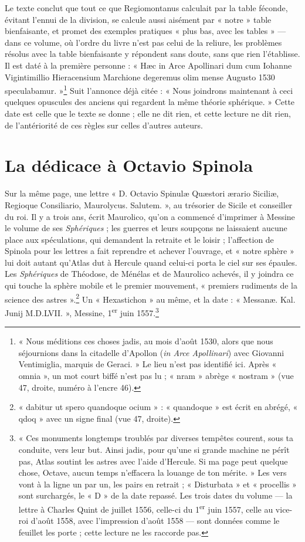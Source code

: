 \documentclass[11pt,a4paper]{article}
\begin{document}
Le texte conclut que tout ce que Regiomontanus calculait par la table féconde,
évitant l'ennui de la division, se calcule aussi aisément par « notre » table
bienfaisante, et promet des exemples pratiques « plus bas, avec les tables » —
dans ce volume, où l'ordre du livre n'est pas celui de la reliure, les problèmes
résolus avec la table bienfaisante y répondent sans doute, sans que rien
l'établisse. Il est daté à la
première personne : « Hæc in Arce Apollinari dum cum Iohanne Vigintimillio
Hieracensium Marchione degeremus olim mense Augusto 1530
speculabamur. »\footnote{« Nous méditions ces choses jadis, au mois d'août 1530,
alors que nous séjournions dans la citadelle d'Apollon (\emph{in Arce
Apollinari}) avec Giovanni Ventimiglia, marquis de Geraci. » Le lieu n'est pas
identifié ici. Après « omnia », un mot court biffé n'est pas lu ; « nram » abrège
« nostram » (vue 47, droite, numéro à l'encre 46).} Suit l'annonce déjà citée :
« Nous joindrons maintenant à ceci quelques opuscules des anciens qui regardent la
même théorie sphérique. » Cette date est celle que le texte se donne ; elle ne
dit rien, et cette lecture ne dit rien, de l'antériorité de ces règles sur celles
d'autres auteurs.

\section*{La dédicace à Octavio Spinola}

Sur la même page, une lettre « D. Octavio Spinulæ Quæstori ærario Siciliæ,
Regioque Consiliario, Maurolycus. Salutem. », au trésorier de Sicile et
conseiller du roi. Il y a trois ans, écrit Maurolico, qu'on a commencé d'imprimer
à Messine le volume de ses \emph{Sphériques} ; les guerres et leurs soupçons ne
laissaient aucune place aux spéculations, qui demandent la retraite et le loisir ;
l'affection de Spinola pour les lettres a fait reprendre et achever l'ouvrage, et
« notre sphère » lui doit autant qu'Atlas dut à Hercule quand celui-ci porta le ciel
sur ses épaules. Les \emph{Sphériques} de Théodose, de Ménélas et de Maurolico
achevés, il y joindra ce qui touche la sphère mobile et le premier mouvement,
« premiers rudiments de la science des astres ».\footnote{« dabitur ut spero
quandoque ocium » : « quandoque » est écrit en abrégé, « qdoq » avec un signe
final (vue 47, droite).} Un « Hexastichon » au même, et la date : « Messanæ. Kal.
Junij M.D.LVII. », Messine, 1\textsuperscript{er} juin 1557.\footnote{« Ces
monuments longtemps troublés par diverses tempêtes courent, sous ta conduite, vers
leur but. Ainsi jadis, pour qu'une si grande machine ne pérît pas, Atlas soutint
les astres avec l'aide d'Hercule. Si ma page peut quelque chose, Octave, aucun
temps n'effacera la louange de ton mérite. » Les vers vont à la ligne un par un,
les pairs en retrait ; « Disturbata » et « procellis » sont surchargés, le « D »
de la date repassé. Les trois dates du volume — la lettre à Charles Quint de
juillet 1556, celle-ci du 1\textsuperscript{er} juin 1557, celle au vice-roi
d'août 1558, avec l'impression d'août 1558 — sont données comme le feuillet les
porte ; cette lecture ne les raccorde pas.}
\end{document}
